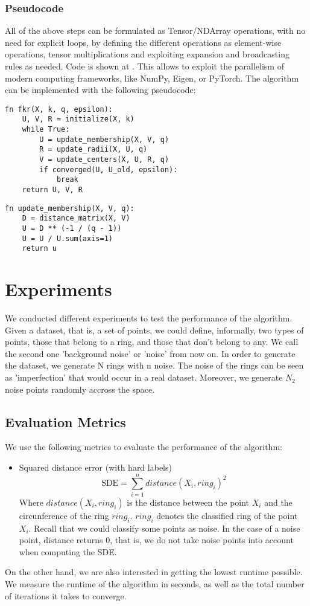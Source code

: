 \documentclass[conference]{IEEEtran}
\begin{document}
\subsubsection{Pseudocode}
All of the above steps can be formulated as Tensor/NDArray operations, with no need for explicit loops,
by defining the different operations as element-wise operations, tensor multiplications and exploiting
expansion and broadcasting rules as needed. Code is shown at \cite{b1}.
This allows to exploit the parallelism of modern computing frameworks, like NumPy, Eigen, or PyTorch.
The algorithm can be implemented with the following pseudocode:
\begin{verbatim}
fn fkr(X, k, q, epsilon):
    U, V, R = initialize(X, k)
    while True:
        U = update_membership(X, V, q)
        R = update_radii(X, U, q)
        V = update_centers(X, U, R, q)
        if converged(U, U_old, epsilon):
            break
    return U, V, R
\end{verbatim}
\begin{verbatim}
fn update_membership(X, V, q):
    D = distance_matrix(X, V)
    U = D ** (-1 / (q - 1))
    U = U / U.sum(axis=1)
    return u
\end{verbatim}

\section{Experiments}
We conducted different experiments to test the performance of the algorithm. Given a dataset, that is, a set of points, we could define, informally,
two types of points, those that belong to a ring, and those that don't belong to any. We call the second one 'background noise' or 'noise' from now on.
In order to generate the dataset, we generate N rings with n noise. The noise of the rings can be seen as 'imperfection' that would occur in a real dataset.
Moreover, we generate $N_2$ noise points randomly accross the space.
\subsection{Evaluation Metrics}
We use the following metrics to evaluate the performance of the algorithm:
\begin{itemize}
    \item Squared distance error (with hard labels)
    \begin{equation}
        \text{SDE} = \sum_{i=1}^{n} distance(X_i, ring_i)^2
    \end{equation}
    Where $distance(X_i, ring_i)$ is the distance between the point $X_i$ and the circunference of the ring $ring_i$.
    $ring_i$ denotes the classified ring of the point $X_i$.
    Recall that we could classify some points as noise. In the case of a noise point, distance returns 0, that is,
    we do not take noise points into account when computing the SDE.
\end{itemize}
On the other hand, we are also interested in getting the lowest runtime possible. We measure the runtime of the algorithm in seconds, as well as the total number of iterations it takes to converge.
\end{document}
